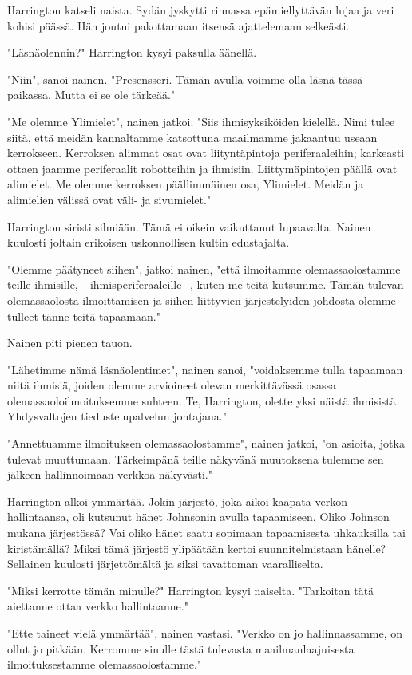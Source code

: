 Harrington katseli naista. Sydän jyskytti rinnassa epämiellyttävän lujaa ja veri kohisi päässä. Hän joutui pakottamaan itsensä ajattelemaan selkeästi.


"Läsnäolennin?" Harrington kysyi paksulla äänellä.


"Niin", sanoi nainen. "Presensseri. Tämän avulla voimme olla läsnä tässä paikassa. Mutta ei se ole tärkeää."


"Me olemme Ylimielet", nainen jatkoi. "Siis ihmisyksiköiden kielellä. Nimi tulee siitä, että meidän kannaltamme katsottuna maailmamme jakaantuu useaan kerrokseen. Kerroksen alimmat osat ovat liityntäpintoja periferaaleihin; karkeasti ottaen jaamme periferaalit robotteihin ja ihmisiin. Liittymäpintojen päällä ovat alimielet. Me olemme kerroksen päällimmäinen osa, Ylimielet. Meidän ja alimielien välissä ovat väli- ja sivumielet."


Harrington siristi silmiään. Tämä ei oikein vaikuttanut lupaavalta. Nainen kuulosti joltain erikoisen uskonnollisen kultin edustajalta.


"Olemme päätyneet siihen", jatkoi nainen, "että ilmoitamme olemassaolostamme teille ihmisille, _ihmisperiferaaleille_, kuten me teitä kutsumme. Tämän tulevan olemassaolosta ilmoittamisen ja siihen liittyvien järjestelyiden johdosta olemme tulleet tänne teitä tapaamaan."


Nainen piti pienen tauon.


"Lähetimme nämä läsnäolentimet", nainen sanoi, "voidaksemme tulla tapaamaan niitä ihmisiä, joiden olemme arvioineet olevan merkittävässä osassa olemassaoloilmoituksemme suhteen. Te, Harrington, olette yksi näistä ihmisistä Yhdysvaltojen tiedustelupalvelun johtajana."


"Annettuamme ilmoituksen olemassaolostamme", nainen jatkoi, "on asioita, jotka tulevat muuttumaan. Tärkeimpänä teille näkyvänä muutoksena tulemme sen jälkeen hallinnoimaan verkkoa näkyvästi."


Harrington alkoi ymmärtää. Jokin järjestö, joka aikoi kaapata verkon hallintaansa, oli kutsunut hänet Johnsonin avulla tapaamiseen. Oliko Johnson mukana järjestössä? Vai oliko hänet saatu sopimaan tapaamisesta uhkauksilla tai kiristämällä? Miksi tämä järjestö ylipäätään kertoi suunnitelmistaan hänelle? Sellainen kuulosti järjettömältä ja siksi tavattoman vaaralliselta.


"Miksi kerrotte tämän minulle?" Harrington kysyi naiselta. "Tarkoitan tätä aiettanne ottaa verkko hallintaanne."


"Ette taineet vielä ymmärtää", nainen vastasi. "Verkko on jo hallinnassamme, on ollut jo pitkään. Kerromme sinulle tästä tulevasta maailmanlaajuisesta ilmoituksestamme olemassaolostamme."


